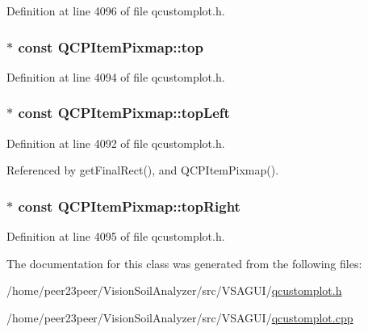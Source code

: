 Definition at line 4096 of file qcustomplot.\+h.

\hypertarget{class_q_c_p_item_pixmap_af7a156590b1d59ab21b453c430c56a7c}{}
\subsubsection[{top}]{$\ast$ const Q\+C\+P\+Item\+Pixmap\+::top}\label{class_q_c_p_item_pixmap_af7a156590b1d59ab21b453c430c56a7c}


Definition at line 4094 of file qcustomplot.\+h.

\hypertarget{class_q_c_p_item_pixmap_a43c281ef6ad46f3cf04f365289abe51a}{}
\subsubsection[{top\+Left}]{$\ast$ const Q\+C\+P\+Item\+Pixmap\+::top\+Left}\label{class_q_c_p_item_pixmap_a43c281ef6ad46f3cf04f365289abe51a}


Definition at line 4092 of file qcustomplot.\+h.



Referenced by get\+Final\+Rect(), and Q\+C\+P\+Item\+Pixmap().

\hypertarget{class_q_c_p_item_pixmap_a72eabd0010be41a4ec1b22aa983d2aa1}{}
\subsubsection[{top\+Right}]{$\ast$ const Q\+C\+P\+Item\+Pixmap\+::top\+Right}\label{class_q_c_p_item_pixmap_a72eabd0010be41a4ec1b22aa983d2aa1}


Definition at line 4095 of file qcustomplot.\+h.



The documentation for this class was generated from the following files\+:\begin{DoxyCompactItemize}
\item 
/home/peer23peer/\+Vision\+Soil\+Analyzer/src/\+V\+S\+A\+G\+U\+I/\hyperlink{qcustomplot_8h}{qcustomplot.\+h}\item 
/home/peer23peer/\+Vision\+Soil\+Analyzer/src/\+V\+S\+A\+G\+U\+I/\hyperlink{qcustomplot_8cpp}{qcustomplot.\+cpp}\end{DoxyCompactItemize}
